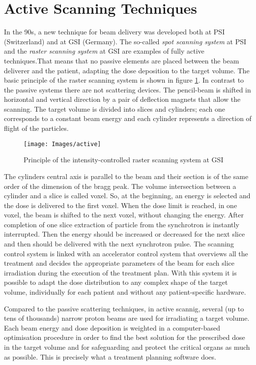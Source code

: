 \documentclass[12pt, a4paper, twoside]{book}
\begin{document}
\section{Active Scanning Techniques}
\label{activeScanning}
In the 90s, a new technique for beam delivery was developed both at PSI (Switzerland) and at GSI (Germany). The so-called \emph{spot scanning system} at PSI and the \emph{raster scanning system} at GSI are examples of  fully active techniques.That means that no passive elements are placed between the beam deliverer and the patient, adapting the dose deposition to the target volume. The basic principle of the raster scanning system is shown in figure \ref{fig:active}.
In contrast to the passive systems there are not scattering devices. The pencil-beam is shifted in horizontal and vertical direction by a pair of deflection magnets that allow the scanning. The target volume is divided into slices and cylinders; each one corresponds to a constant beam energy and each cylinder represents a direction of flight of the particles.
\begin{figure}[!b]
{\texttt{[image: Images/active]}}
\caption{Principle of the intensity-controlled raster scanning system at GSI \cite{hab:scan}}
\label{fig:active}
\end{figure}
The cylinders central axis is parallel to the beam and their section is of the same order of the dimension of the bragg peak. The volume intersection between a cylinder and a slice is called voxel.
So, at the beginning, an energy is selected and the dose is delivered to the first voxel.
When the dose limit is reached, in one voxel, the beam is shifted to the next voxel, without changing the energy. After completion of one slice extraction of particle from the synchrotron is instantly interrupted. Then the energy should be increased or decreased for the next slice and then should be delivered with the next synchrotron pulse. The scanning control system is linked with an accelerator control system that overviews all the treatment and decides the appropriate parameters of the beam for each slice irradiation during the execution of the treatment plan. 
With this system it is possible to adapt the dose distribution to any complex shape of the target volume, individually for each patient and without any patient-specific hardware.

Compared to the passive scattering techniques, in active scannig, several (up to tens of thousands) narrow proton beams are used for irradiating a target volume. Each beam energy and dose deposition is weighted in a computer-based optimisation procedure in order to find the best solution for the prescribed dose in the target volume and for safeguarding and protect the critical organs as much as possible.
This is precisely what a treatment planning software does.
\end{document}
